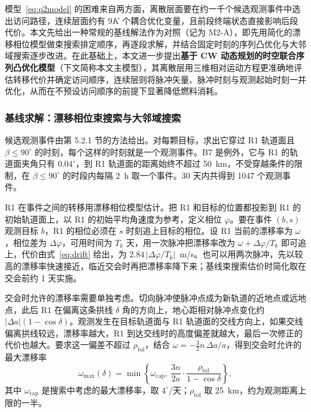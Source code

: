模型~\eqref{eq:q2model} 的困难来自两方面，离散层面要在约一千个候选观测事件中选出访问路径，连续层面约有 $9K$ 个耦合优化变量，且前段终端状态直接影响后段代价。本文先给出一种常规的基线解法作为对照（记为 M2-A），即先用简化的漂移相位模型做束搜索排定顺序，再逐段求解，并结合固定时刻的序列凸优化与大邻域搜索逐步改进。在此基础上，本文进一步提出\textbf{基于 CW 动态规划的时空联合序列凸优化模型}（下文简称本文主模型），其离散层用三维相对运动方程更准确地评估转移代价并确定访问顺序，连续层则将脉冲矢量、脉冲时刻与观测起始时刻一并优化，从而在不预设访问顺序的前提下显著降低燃料消耗。

\subsubsection{基线求解：漂移相位束搜索与大邻域搜索}

候选观测事件由第 5.2.1 节的方法给出。对每颗目标，求出它穿过 R1 轨道面且 $\beta \le 90^\circ$ 的时刻，每个这样的时刻就是一个观测事件。B7 是例外，它与 R1 的轨道面夹角只有 $0.04^\circ$，到 R1 轨道面的距离始终不超过 50~km，不受穿越条件的限制，在 $\beta \le 90^\circ$ 的时段内每隔 2~h 取一个事件。30 天内共得到 1047 个观测事件。

R1 在事件之间的转移用漂移相位模型估计。把 R1 和目标的位置都投影到 R1 的初始轨道面上，以 R1 的初始平均角速度为参考，定义相位 $\varphi$。要在事件 $(b, s)$ 观测目标 $b$，R1 的相位必须在 $s$ 时刻追上目标的相位。设 R1 当前的漂移率为 $\omega$，相位差为 $\Delta\varphi$，可用时间为 $T_k$ 天，用一次脉冲把漂移率改为 $\omega + \Delta\varphi/T_k$ 即可追上，代价由式~\eqref{eq:drift} 给出，为 $2.84\,|\Delta\varphi/T_k|$~m/s。也可以用两次脉冲，先以较高的漂移率快速接近，临近交会时再把漂移率降下来；基线束搜索估价时简化取在交会前约 1 天实施。

交会时允许的漂移率需要单独考虑。切向脉冲使脉冲点成为新轨道的近地点或远地点，此后 R1 在偏离这条拱线 $\delta$ 角的方向上，地心距相对脉冲点变化约 $|\Delta a|(1 - \cos\delta)$。观测发生在目标轨道面与 R1 轨道面的交线方向上，如果交线偏离拱线较远，漂移率越大，R1 到达交线时的高度偏差就越大，最后一次修正的代价也越大。要求这一偏差不超过 $\rho_{\mathrm{tol}}$，结合 $\omega = -\tfrac32 n\,\Delta a/a$，得到交会时允许的最大漂移率
\begin{equation}
  \omega_{\max}(\delta) = \min\left\{\omega_{\mathrm{cap}},\ \frac{3n}{2a}\cdot\frac{\rho_{\mathrm{tol}}}{1 - \cos\delta}\right\} ,
  \label{eq:wmax}
\end{equation}
其中 $\omega_{\mathrm{cap}}$ 是搜索中考虑的最大漂移率，取 $4^\circ$/天；$\rho_{\mathrm{tol}}$ 取 25~km，约为观测距离上限的一半。

